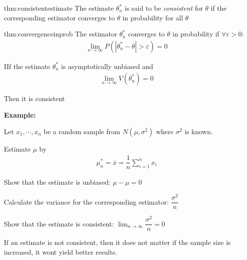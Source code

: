 \newpage
\begin{theo}{thm:consistentestimate}
  The estimate $\theta_n^*$ is said to be \textit{consistent} for $\theta$ if the corresponding estimator converges to $\theta$ in probability for all $\theta$
\end{theo}
\par\bigskip
\begin{theo}{thm:convergenceinprob}
  The estimator $\theta_n^*$ converges to $\theta$ in probability if $\forall \varepsilon>0$:
  \begin{equation*}
    \begin{gathered}
      \lim_{n\to\infty} P(\left|\theta_n^*-\theta\right|>\varepsilon)=0
    \end{gathered}
  \end{equation*}
\end{theo}
\par\bigskip
\begin{theo}
  IIf the estimate $\theta_n^*$ is asymptotically unbiased and
  \begin{equation*}
    \begin{gathered}
      \lim_{n\to\infty} V(\theta_n^*) = 0
    \end{gathered}
  \end{equation*}\par
  \noindent Then it is consistent
\end{theo}
\par\bigskip
\noindent\textbf{Example:}\par
\noindent Let $x_1,\cdots,x_n$ be a random sample from $N(\mu,\sigma^2)$ where $\sigma^2$ is known.\par
\noindent Estimate $\mu$ by
\begin{equation*}
  \begin{gathered}
    \mu_n^* = \overline{x} = \dfrac{1}{n}\sum_{i=1}^{n}x_i
  \end{gathered}
\end{equation*}\par
\noindent Show that the estimate is unbiased: $\mu-\mu=0$\par
\noindent Calculate the variance for the corresponding estimator: $\dfrac{\sigma^2}{n}$\par
\noindent Show that the estimate is consistent: $\lim_{n\to\infty}\dfrac{\sigma^2}{n} =0$
\par\bigskip
\noindent If an estimate is not consistent, then it does not matter if the sample size is increased, it wont yield better results.

